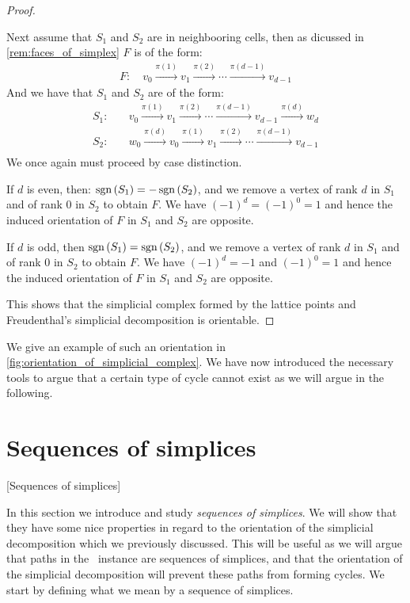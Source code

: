 \begin{proof}
    \begin{case}{2}
        Next assume that $S_1$ and $S_2$ are in neighbooring cells, then as dicussed in \cref{rem:faces_of_simplex} $F$ is of the form:
        \begin{align*}
            F: \quad v_0 \xrightarrow{\pi(1)} v_1 \xrightarrow{\pi(2)} \cdots  \xrightarrow{\pi(d-1)} v_{d-1}
        \end{align*}
        And we have that $S_1$ and $S_2$ are of the form:
        \begin{align*}
            S_1: & \quad v_0 \xrightarrow{\pi(1)} v_1 \xrightarrow{\pi(2)} \cdots \xrightarrow{\pi(d-1)} v_{d-1} \xrightarrow{\pi(d)} w_d \\
            S_2: & \quad w_0 \xrightarrow{\pi(d)} v_0 \xrightarrow{\pi(1)} v_1 \xrightarrow{\pi(2)} \cdots \xrightarrow{\pi(d-1)} v_{d-1} \\
        \end{align*}
        We once again must proceed by case distinction.
        \begin{case}{2.1}
            If $d$ is even, then: $\operatorname{sgn}\left(S_1\right) = - \operatorname{sgn}\left(S_2\right)$, and we remove a vertex of rank $d$ in $S_1$ and of rank $0$ in $S_2$ to obtain $F$. We have $(-1)^d = (-1)^0 = 1$ and hence the induced orientation of $F$ in $S_1$ and $S_2$ are opposite.
        \end{case}
        \begin{case}{2.2}
            If $d$ is odd, then $\operatorname{sgn}\left(S_1\right) = \operatorname{sgn}\left(S_2\right)$, and we remove a vertex of rank $d$ in $S_1$ and of rank $0$ in $S_2$ to obtain $F$. We have $(-1)^d = -1$ and $(-1)^0 = 1$ and hence the induced orientation of $F$ in $S_1$ and $S_2$ are opposite.
        \end{case}
    \end{case}
    This shows that the simplicial complex formed by the lattice points and Freudenthal's simplicial decomposition is orientable.
\end{proof}

We give an example of such an orientation in \cref{fig:orientation_of_simplicial_complex}. We have now introduced the necessary tools to argue that a certain type of cycle cannot exist as we will argue in the following.

\section{Sequences of simplices}[Sequences of simplices]

In this section we introduce and study \emph{sequences of simplices}. We will show that they have some nice properties in regard to the orientation of the simplicial decomposition which we previously discussed. This will be useful as we will argue that paths in the \EndOfLine\ instance are sequences of simplices, and that the orientation of the simplicial decomposition will prevent these paths from forming cycles. We start by defining what we mean by a sequence of simplices.

